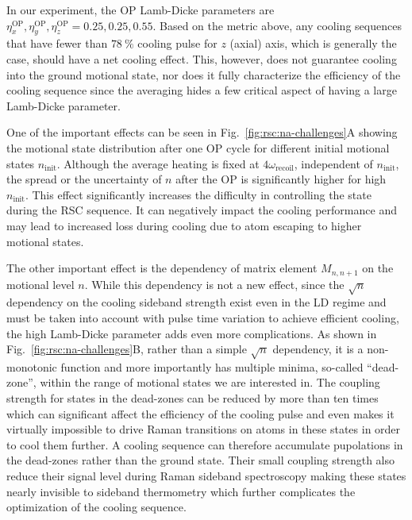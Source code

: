 In our experiment, the OP Lamb-Dicke parameters are
$\eta^{\mathrm{OP}}_x, \eta^{\mathrm{OP}}_y, \eta^{\mathrm{OP}}_z = 0.25, 0.25, 0.55$.
Based on the metric above, any cooling sequences
that have fewer than $78~\%$ cooling pulse for $z$ (axial) axis, which is generally the case,
should have a net cooling effect.
This, however, does not guarantee cooling into the ground motional state,
nor does it fully characterize the efficiency of the cooling sequence
since the averaging hides a few critical aspect of having a large Lamb-Dicke parameter.

One of the important effects can be seen in Fig.~\ref{fig:rsc:na-challenges}A showing
the motional state distribution after one OP cycle
for different initial motional states $n_{\mathrm{init}}$.
Although the average heating is fixed at $4\omega_{\mathrm{recoil}}$,
independent of $n_{\mathrm{init}}$,
the spread or the uncertainty of $n$ after the OP is significantly
higher for high $n_{\mathrm{init}}$.
This effect significantly increases the difficulty in controlling the state during the
RSC sequence. It can negatively impact the cooling performance and
may lead to increased loss during cooling due to atom escaping to higher motional states.

The other important effect is the dependency of matrix element $M_{n,n+1}$
on the motional level $n$.
While this dependency is not a new effect, since the $\sqrt{n}$ dependency
on the cooling sideband strength exist even in the LD regime
and must be taken into account with pulse time variation
\cite{wineland_experimental_1998,liu_molecular_2019}
to achieve efficient cooling, the high Lamb-Dicke parameter adds even more complications.
As shown in Fig.~\ref{fig:rsc:na-challenges}B, rather than a simple $\sqrt{n}$ dependency,
it is a non-monotonic function and more importantly has multiple minima, so-called ``dead-zone'',
within the range of motional states we are interested in.
The coupling strength for states in the dead-zones can be reduced by more than ten times
which can significant affect the efficiency of the cooling pulse
and even makes it virtually impossible to drive Raman transitions on atoms in these states
in order to cool them further.
A cooling sequence can therefore accumulate pupolations in the dead-zones
rather than the ground state.
Their small coupling strength also reduce their signal level during
Raman sideband spectroscopy making these states nearly invisible to sideband thermometry
which further complicates the optimization of the cooling sequence.

